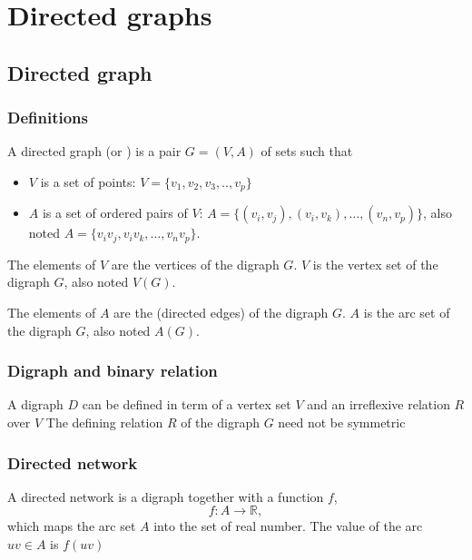 \documentclass[aspectratio=43]{beamer}
\begin{document}
\section{Directed graphs}


\subsection{Directed graph}
\begin{frame} \frametitle{Definitions} 
\begin{definition}[{Digraph}]
A directed graph (or ) is a pair $G=(V,A)$ of sets such that
\begin{itemize}
\item $V$ is a set of points:  $V=\{v_1,v_2,v_3,..,v_p\}$
\item $A$ is a set of ordered pairs of $V$: $A=\{(v_i,v_j),(v_i,v_k),\dots,(v_n,v_p)\}$, also noted $A=\{v_iv_j,v_iv_k,\dots,v_nv_p\}$.
\end{itemize}
\end{definition}
\begin{definition}[{Vertex}]
The elements of $V$ are the vertices of the digraph $G$.
$V$ is the vertex set of the digraph $G$, also noted $V(G)$.
\end{definition}
\begin{definition}[{Arc}]
The elements of $A$ are the  (directed edges) of the digraph $G$.
$A$ is the arc set of the digraph $G$, also noted $A(G)$.
\end{definition}
\end{frame}



\begin{frame}\frametitle{Digraph and binary relation}
A digraph $D$ can be defined in term of a vertex set $V$ and an irreflexive relation $R$ over $V$
\vfill
The defining relation $R$ of the digraph $G$ need not be symmetric
\end{frame}


\begin{frame}\frametitle{Directed network}
\begin{definition}
A directed network is a digraph together with a function $f$,
\[
f: A \rightarrow \mathbb{R},
\]
which maps the arc set $A$ into the set of real number. 
The value of the arc $uv \in A$ is $f(uv)$
\end{definition}
\end{frame}
\end{document}
